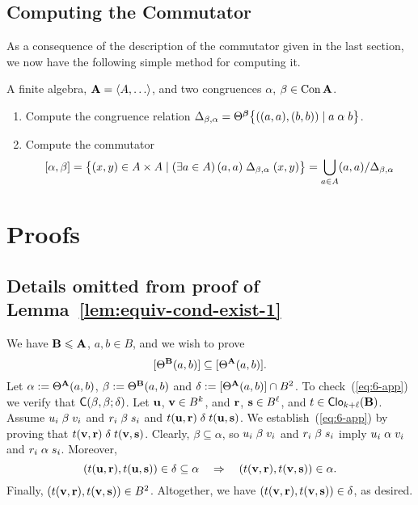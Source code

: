 \subsection{Computing the Commutator}

As a consequence of the description of the commutator given in the last section,
we now have the following simple method for computing it.

\smallskip

 A finite algebra, $\bA = \<A, \dots\>$, and two congruences $\alpha$, $\beta \in \operatorname{Con} \mathbf{A}$.

\smallskip
{}

\begin{enumerate}[Step 1.]
\item Compute the congruence relation
  $\Delta_{\beta, \alpha} = \Theta^{\boldsymbol{\beta}}\bigl\{((a,a), (b,b)) \mid a \mathrel{\alpha} b \bigr\}$.
\item Compute the commutator
  \[[\alpha, \beta] 
  = \bigl\{(x,y) \in A\times A \mid (\exists a \in A) \, (a,a) \mathrel{\Delta_{\beta, \alpha}} (x,y)\bigr\} 
  =\bigcup_{a\in A} (a,a)/\Delta_{\beta, \alpha}
    \]
\end{enumerate}



\section{Proofs}
\subsection{Details omitted from proof of Lemma~\ref{lem:equiv-cond-exist-1}}
\label{sec:details-omitted-from}
We have $\mathbf{B} \leqslant \mathbf{A}$, $a, b \in B$, and we wish to prove
\begin{equation}
    \label{eq:6-app}
    \Com{\Cg^{\bB} (a, b)} \subseteq \Com{\Cg^{\bA} (a, b)}.
\end{equation}
Let $\alpha := \Theta^{\mathbf{A}} (a, b)$, $\beta := \Theta^{\mathbf{B}} (a, b)$ and
$\delta:=[\Theta^{\mathbf{A}} (a, b)] \cap B^2$. 
To check~(\ref{eq:6-app}) we verify that $\mathsf{C}(\beta, \beta; \delta)$.
Let $\mathbf{u}$, $\mathbf{v} \in B^{k}$, and $\mathbf{r}$, $\mathbf{s} \in B^{\ell}$, and
$t\in \operatorname{\mathsf{Clo}}_{k+\ell}(\mathbf{B})$.  Assume
$u_i \mathrel{\beta} v_i$ and $r_i \mathrel{\beta} s_i$
and $t(\mathbf{u}, \mathbf{r}) \mathrel{\delta} t(\mathbf{u}, \mathbf{s})$.
We establish~(\ref{eq:6-app}) by proving that
$t(\mathbf{v}, \mathbf{r}) \mathrel{\delta} t(\mathbf{v}, \mathbf{s})$.
Clearly,
$\beta \subseteq \alpha$, so 
$u_i \mathrel{\beta} v_i$ and $r_i \mathrel{\beta} s_i$ imply
$u_i \mathrel{\alpha} v_i$ and $r_i \mathrel{\alpha} s_i$.  Moreover,
\[
(t(\mathbf{u}, \mathbf{r}), t(\mathbf{u}, \mathbf{s})) \in
\delta \subseteq \alpha \quad \Rightarrow \quad
(t(\mathbf{v}, \mathbf{r}), t(\mathbf{v}, \mathbf{s})) \in \alpha.
\]
Finally, 
$(t(\mathbf{v}, \mathbf{r}), t(\mathbf{v}, \mathbf{s})) \in B^2$. Altogether, we have
$(t(\mathbf{v}, \mathbf{r}), t(\mathbf{v}, \mathbf{s})) \in \delta$, as desired.


